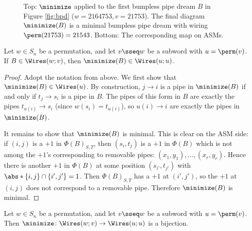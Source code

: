 \begin{figure}
    \caption{
    Top: $\minimize$ applied to the first bumpless pipe dream $B$ in Figure \ref{fig:bpd} ($w=2164753, v=21753$).
    The final diagram $\minimize(B)$ is a minimal bumpless pipe dream with wiring $\perm(21753) = 21543$.
    Bottom: The corresponding map on ASMs.
    }
    \label{fig:phi_v^w}
\end{figure}

\begin{lemma}
\label{lem:remov_min}
    Let $w\in S_n$ be a permutation, and let $v\sseq w$ be a subword with $u = \perm(v)$.
    If $B\in \Wires(w;v)$, then $\minimize(B) \in \Wires(u;u)$.
\end{lemma}

\begin{proof}
    Adopt the notation from above.
    We first show that $\minimize(B)\in \Wires(u)$.
    By construction, $j\to i$ is a pipe in $\minimize(B)$ if and only if $t_j\to s_i$ is a pipe in $B$.
    The pipes of this form in $B$ are exactly the pipes $t_{u(i)}\to s_i$ (since $w(s_i) = t_{u(i)}$), so $u(i) \to i$ are exactly the pipes in $\minimize(B)$.
    
    It remains to show that $\minimize(B)$ is minimal.
    This is clear on the ASM side: if $(i,j)$ is a $+1$ in $\Phi(B)_{S,T}$, then $(s_i,t_j)$ is a $+1$ in $\Phi(B)$ which is not among the $+1$'s corresponding to removable pipes: $(x_1,y_1),\dots,(x_r,y_r)$.
    Hence there is another $+1$ in $\Phi(B)$ at some position $(s_{i'},t_{j'})$ with $\abs*{\{i,j\}\cap \{i',j'\}} = 1$.
    Then $\Phi(B)_{S,T}$ has a $+1$ at $(i',j')$, so the $+1$ at $(i,j)$ does not correspond to a removable pipe.
    Therefore $\minimize(B)$ is minimal.
\end{proof}

\begin{proposition}
\label{prop:BPD_bij}
    Let $w\in S_n$ be a permutation, and let $v\sseq w$ be a subword with $u = \perm(v)$.
    Then $\minimize\colon \Wires(w;v)\to \Wires(u;u)$ is a bijection.
\end{proposition}

